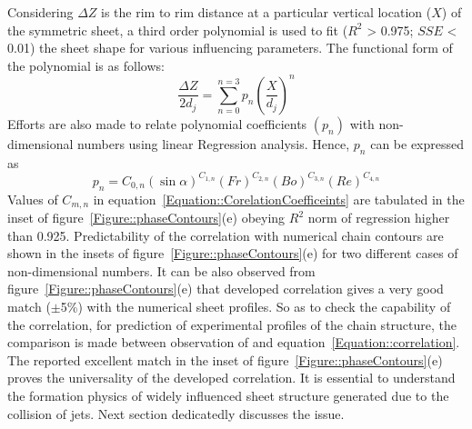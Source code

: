 \documentclass{jfm}
\begin{document}
Considering $\Delta Z$ is the rim to rim distance at a particular vertical location ($X$) of the symmetric sheet, a third order polynomial is used to fit ($R^2$ > 0.975; $SSE$ < 0.01) the sheet shape for various influencing parameters. The functional form of the polynomial is as follows: 
\begin{equation}\label{Equation::correlation}
\frac{\Delta Z}{2d_j} = \sum_{n = 0}^{n = 3}p_n\left(\frac{X}{d_j}\right)^n
\end{equation}
Efforts are also made to relate polynomial coefficients $\left(p_n\right)$ with non-dimensional numbers using linear Regression analysis. Hence, $p_n$ can be expressed as
\begin{equation}\label{Equation::CorelationCoefficeints}
p_n = C_{0,n}\left(\sin\alpha\right)^{C_{1,n}}\left(Fr\right)^{C_{2,n}}\left(Bo\right)^{C_{3,n}}\left(Re\right)^{C_{4,n}}
\end{equation}
Values of $C_{m,n}$ in equation~\ref{Equation::CorelationCoefficeints} are tabulated in the inset of figure~\ref{Figure::phaseContours}(e) obeying $R^2$ norm of regression higher than 0.925. Predictability of the correlation with numerical chain contours are shown in the insets of figure~\ref{Figure::phaseContours}(e) for two different cases of non-dimensional numbers. It can be also observed from figure~\ref{Figure::phaseContours}(e) that developed correlation gives a very good match ($\pm$5\%) with the numerical sheet profiles. So as to check the capability of the correlation, for prediction of experimental profiles of the chain structure, the comparison is made between observation of \cite{bush2004collision} and equation~\ref{Equation::correlation}. The reported excellent match in the inset of figure~\ref{Figure::phaseContours}(e) proves the universality of the developed correlation. It is essential to understand the formation physics of widely influenced sheet structure generated due to the collision of jets. Next section dedicatedly discusses the issue.
\end{document}
